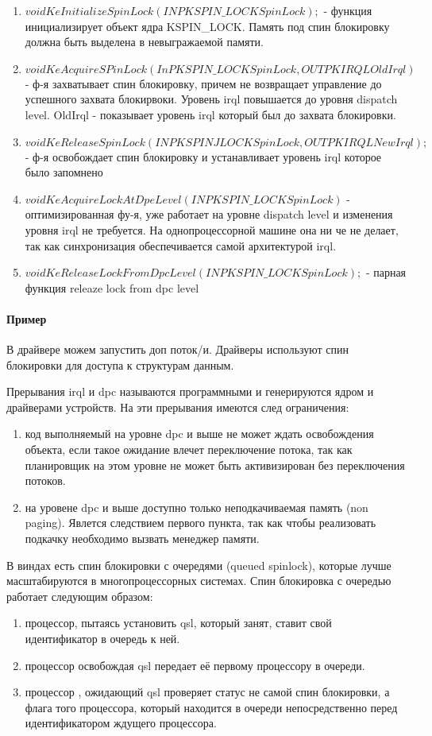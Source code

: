 \begin{enumerate}
	\item $void KeInitializeSpinLock(IN PKSPIN\_LOCK SpinLock);$ - функция инициализирует объект ядра KSPIN\_LOCK. Память под спин блокировку должна быть выделена в невыгражаемой памяти.
	\item $void KeAcquireSPinLock(In PKSPIN\_LOCK SpinLock, OUT PKIRQL OldIrql)$ - ф-я захватывает спин блокировку, причем не возвращает управление до успешного захвата блокирвоки. Уровень irql  повышается до уровня dispatch level. OldIrql - показывает уровень irql который был до захвата блокировки.
	\item $void KeReleaseSpinLock(IN PKSPINJLOCK SpinLock, OUT PKIRQL NewIrql);$ - ф-я освобождает спин блокировку и устанавливает уровень irql которое было запомнено
	\item $void KeAcquireLockAtDpeLevel(IN PKSPIN\_LOCK SpinLock)$ - оптимизированная фу-я, уже работает на уровне dispatch level и изменения уровня irql не требуется. На однопроцессорной машине она ни че не делает, так как синхронизация обеспечивается самой архитектурой irql.
	\item $void KeReleaseLockFromDpcLevel(IN PKSPIN\_LOCK SpinLock);$ - парная функция releaze lock from dpc level
\end{enumerate}	

\paragraph{Пример}
В драйвере можем запустить доп поток/и. Драйверы используют спин блокировки для доступа к структурам данным.
 

Прерывания irql и dpc называются программными и генерируются ядром и драйверами устройств. На эти прерывания имеются след ограничения:
\begin{enumerate}
	\item код выполняемый на уровне dpc и выше не может ждать освобождения объекта, если такое ожидание влечет переключение потока, так как планировщик на этом уровне не может быть активизирован без переключения потоков.
	\item на уровене dpc и выше доступно  только неподкачиваемая память (non paging). Явлется следствием первого пункта, так как чтобы реализовать подкачку необходимо вызвать менеджер памяти.
\end{enumerate}

В виндах есть спин блокировки с очередями (queued spinlock), которые лучше масштабируются в многопроцессорных системах. Спин блокировка с очередью работает следующим образом: 
\begin{enumerate}
	\item процессор, пытаясь установить qsl, который занят, ставит свой идентификатор в очередь к ней.
	\item процессор освобождая qsl передает её первому процессору в очереди.
	\item процессор , ожидающий qsl проверяет статус не самой спин блокировки, а флага того процессора,  который находится в очереди непосредственно перед идентификатором ждущего процессора. 
\end{enumerate}

